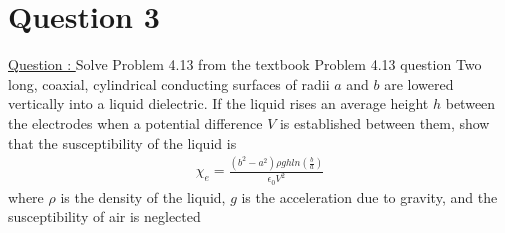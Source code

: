 \documentclass[12pt]{article}
\begin{document}
    
\newpage
\section{Question 3} \label{section3}
    \underline{Question : }
    Solve Problem 4.13 from the textbook
    \newline Problem 4.13 question
    \newline Two long, coaxial, cylindrical conducting surfaces of radii $a$ and $b$ are lowered vertically into a liquid dielectric. If the liquid rises an average height $h$ between the electrodes when a potential difference $V$ is established between them, show that the susceptibility of the liquid is 
    \begin{gather*}
        \chi_e = \frac{(b^2-a^2) \rho g h ln(\frac{b}{a})}{\epsilon_0 V^2}
    \end{gather*}
    where $\rho$ is the density of the liquid, $g$ is the acceleration due to gravity, and the susceptibility of air is neglected
    
\end{document}
